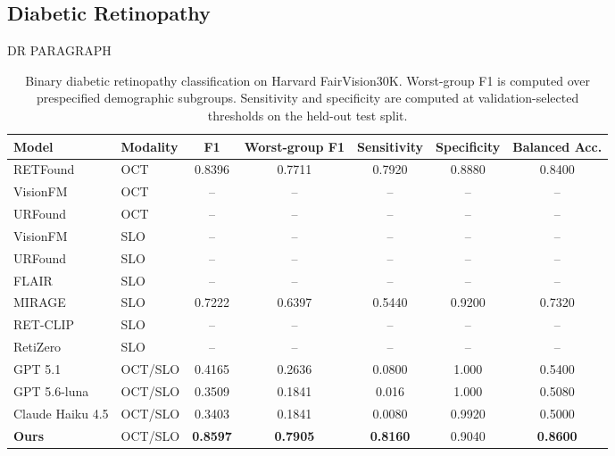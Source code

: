 \subsection{Diabetic Retinopathy}
DR PARAGRAPH
\begin{table}[t]
\centering
\caption{Binary diabetic retinopathy classification on Harvard FairVision30K.
Worst-group F1 is computed over prespecified demographic subgroups.
Sensitivity and specificity are computed at validation-selected thresholds on
the held-out test split.}
\label{tab:dr_fairvision30k}
\begin{tabular}{@{}llccccc@{}}
\toprule
\textbf{Model} & \textbf{Modality} & \textbf{F1} &
\textbf{Worst-group F1} & \textbf{Sensitivity} &
\textbf{Specificity} & \textbf{Balanced Acc.} \\
\midrule
RETFound & OCT & 0.8396 & 0.7711 & 0.7920 & 0.8880 & 0.8400 \\
VisionFM & OCT & -- & -- & -- & -- & -- \\
URFound & OCT & -- & -- & -- & -- & -- \\
VisionFM & SLO & -- & -- & -- & -- & -- \\
URFound & SLO & -- & -- & -- & -- & -- \\
FLAIR & SLO & -- & -- & -- & -- & -- \\
MIRAGE & SLO & 0.7222 & 0.6397 & 0.5440 & 0.9200 & 0.7320 \\
RET-CLIP & SLO & -- & -- & -- & -- & -- \\
RetiZero & SLO & -- & -- & -- & -- & -- \\
GPT 5.1 & OCT/SLO & 0.4165 & 0.2636 & 0.0800 & 1.000 & 0.5400 \\
GPT 5.6-luna & OCT/SLO & 0.3509 & 0.1841 & 0.016 & 1.000 & 0.5080 \\
Claude Haiku 4.5 & OCT/SLO & 0.3403 & 0.1841 & 0.0080 & 0.9920 & 0.5000 \\
\textbf{Ours} & OCT/SLO & \textbf{0.8597} & \textbf{0.7905} & \textbf{0.8160} & 0.9040 & \textbf{0.8600} \\
\bottomrule
\end{tabular}
\end{table}

